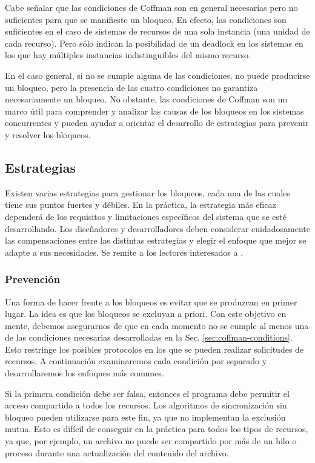 Cabe señalar que las condiciones de Coffman son en general necesarias pero no suficientes
para que se manifieste un bloqueo. En efecto, las condiciones son suficientes en el caso de
sistemas de recursos de una sola instancia (una unidad de cada recurso).
Pero sólo indican la posibilidad de un deadlock
en los sistemas en los que hay múltiples instancias indistinguibles del mismo recurso.

En el caso general, si no se cumple alguna de las condiciones, no puede producirse un bloqueo,
pero la presencia de las cuatro condiciones no garantiza necesariamente un bloqueo. No
obstante, las condiciones de Coffman son un marco útil para comprender y analizar las causas
de los bloqueos en los sistemas concurrentes y pueden ayudar a orientar el desarrollo de
estrategias para prevenir y resolver los bloqueos.

\subsection{Estrategias}
\label{sec:deadlock-strategies}

Existen varias estrategias para gestionar los bloqueos,
cada una de las cuales tiene sus puntos fuertes y débiles.
En la práctica, la estrategia más eficaz dependerá de los requisitos y
limitaciones específicos del sistema que se esté desarrollando.
Los diseñadores y desarrolladores deben considerar cuidadosamente
las compensaciones entre las distintas
estrategias y elegir el enfoque que mejor se adapte a sus necesidades.
Se remite a los lectores
interesados a \cite{coffman1971deadlocks,singhal1989deadlock}.

\subsubsection{Prevención}

Una forma de hacer frente a los bloqueos es evitar que se produzcan en primer lugar. La idea es
que los bloqueos se excluyan a priori. Con este objetivo en mente, debemos asegurarnos de que
en cada momento no se cumple al menos una de las condiciones necesarias desarrolladas en la
Sec. \ref{sec:coffman-conditions}.
Esto restringe los posibles protocolos en los que se pueden realizar solicitudes de
recursos. A continuación examinaremos cada condición por separado y desarrollaremos los
enfoques más comunes.

Si la primera condición debe ser falsa, entonces el programa debe permitir el acceso
compartido a todos los recursos. Los algoritmos de sincronización sin bloqueo pueden
utilizarse para este fin, ya que no implementan la exclusión mutua. Esto es difícil de conseguir
en la práctica para todos los tipos de recursos, ya que, por ejemplo, un archivo no puede ser
compartido por más de un hilo o proceso durante una actualización del contenido del archivo.

